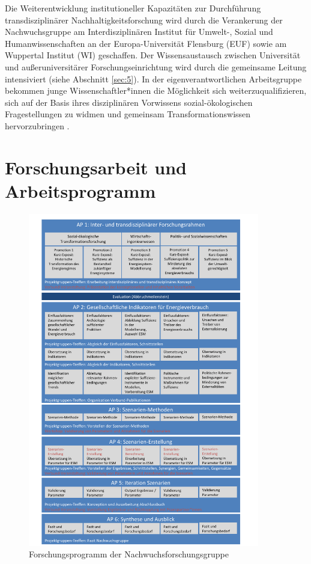 \documentclass[a4paper,11pt,twoside]{scrartcl}
\begin{document}
Die Weiterentwicklung institutioneller Kapazitäten zur Durchführung transdisziplinärer Nachhaltigkeitsforschung wird durch die Verankerung der Nachwuchsgruppe am Interdisziplinären Institut für Umwelt-, Sozial und Humanwissenschaften an der Europa-Universität Flensburg (EUF) sowie am Wuppertal Institut (WI) geschaffen. Der Wissensaustausch zwischen Universität und außeruniversitärer Forschungseinrichtung wird durch die gemeinsame Leitung intensiviert (siehe Abschnitt \ref{sec:5}). In der eigenverantwortlichen Arbeitsgruppe bekommen junge Wissenschaftler*innen die Möglichkeit sich weiterzuqualifizieren, sich auf der Basis ihres disziplinären Vorwissens sozial-ökologischen Fragestellungen zu widmen und gemeinsam Transformationswissen hervorzubringen \cite{Schneidewind2014}. 

\section{Forschungsarbeit und Arbeitsprogramm}
\label{sec:4}
\begin{figure}[!h]
    \centering
    \includegraphics[width=0.9\textwidth]{figures/Forschungsarbeit4.pdf}
    \caption{Forschungsprogramm der Nachwuchsforschungsgruppe}
    \label{fig:forschungsprogramm}
\end{figure}
\end{document}

